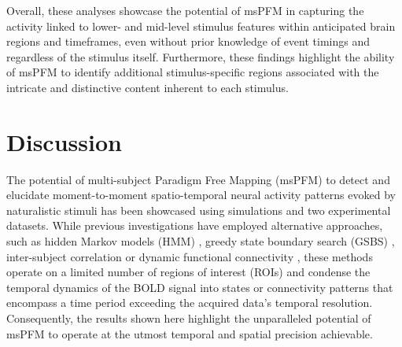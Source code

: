 Overall, these analyses showcase the potential of msPFM in capturing the
activity linked to lower- and mid-level stimulus features within anticipated
brain regions and timeframes, even without prior knowledge of event timings and
regardless of the stimulus itself. Furthermore, these findings highlight the
ability of msPFM to identify additional stimulus-specific regions associated
with the intricate and distinctive content inherent to each stimulus.

\section{Discussion}
\label{sec:multi_subject_discussion}

The potential of multi-subject Paradigm Free Mapping (msPFM) to detect and elucidate
moment-to-moment spatio-temporal neural activity patterns evoked by naturalistic
stimuli has been showcased using simulations and two experimental datasets.
While previous investigations have employed alternative approaches, such as
hidden Markov models (HMM) \citep{Baldassano2017DiscoveringEventStructure},
greedy state boundary search (GSBS) \citep{Geerligs2021Detectingneuralstate},
inter-subject correlation \citep{Nastase2019Measuringsharedresponses} or dynamic
functional connectivity \citep{Di2020Intersubjectconsistentdynamic}, these
methods operate on a limited number of regions of interest (ROIs) and condense
the temporal dynamics of the BOLD signal into states or connectivity patterns
that encompass a time period exceeding the acquired data's temporal resolution.
Consequently, the results shown here highlight the unparalleled potential of
msPFM to operate at the utmost temporal and spatial precision achievable.

